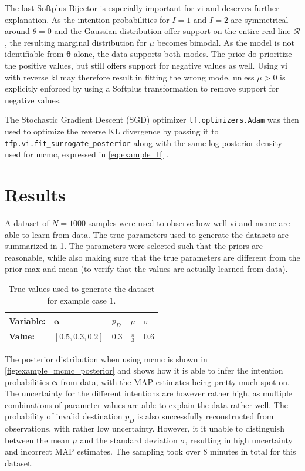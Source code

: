 The last Softplus Bijector is especially important for \acrshort{vi} and deserves further explanation. As the intention probabilities for $I=1$ and $I=2$ are symmetrical around $\theta=0$ and the Gaussian distribution offer support on the entire real line $\mathcal{R}$, the resulting marginal distribution for $\mu$ becomes bimodal. As the model is not identifiable from $\boldsymbol{\theta}$ alone, the data supports both modes. The prior do prioritize the positive values, but still offers support for negative values as well.  Using \acrshort{vi} with reverse \acrshort{kl} may therefore result in fitting the wrong mode, unless $\mu > 0$ is explicitly enforced by using a Softplus transformation to remove support for negative values. 

The Stochastic Gradient Descent (SGD) optimizer \texttt{tf.optimizers.Adam} was then used to optimize the reverse KL divergence by passing it to \texttt{tfp.vi.fit\_surrogate\_posterior} along with the same log posterior density used for \acrshort{mcmc}, expressed in \cref{eq:example_ll} \cite{tensorflow2015-whitepaper}. 

\section{Results}
A dataset of $N=1000$ samples were used to observe how well \acrshort{vi} and \acrshort{mcmc} are able to learn from data. The true parameters used to generate the datasets are summarized in \cref{tbl:example_params}. The parameters were selected such that the priors are reasonable, while also making sure that the true parameters are different from the prior max and mean (to verify that the values are actually learned from data). 
\begin{table}[h]
\centering
\begin{tabular}{lllll}
\textbf{Variable:}   & $\boldsymbol{\alpha}$ & $p_D$ & $\mu$                  & $\sigma$         \\ \hline
\textbf{Value:} & $[0.5, 0.3, 0.2]$     & $0.3$ & $\frac{\pi}{3}$ & $0.6$ \\
\end{tabular}
\caption{True values used to generate the dataset for example case 1.}
\label{tbl:example_params}
\end{table}


The posterior distribution when using \acrshort{mcmc} is shown in \cref{fig:example_mcmc_posterior} and shows how it is able to infer the intention probabilities $\boldsymbol{\alpha}$ from data, with the MAP estimates being pretty much spot-on. The uncertainty for the different intentions are however rather high, as multiple combinations of parameter values are able to explain the data rather well. The probability of invalid destination $p_D$ is also successfully reconstructed from observations, with rather low uncertainty. However, it it unable to distinguish between the mean $\mu$ and the standard deviation $\sigma$, resulting in high uncertainty and incorrect MAP estimates. The sampling took over 8 minutes in total for this dataset. 

